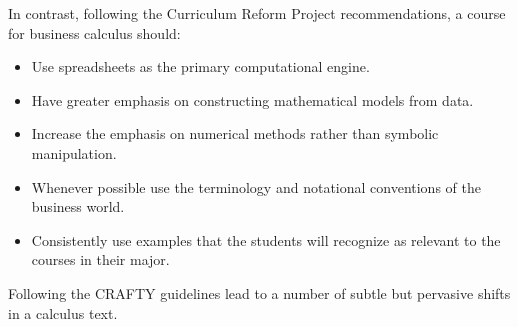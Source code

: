 \documentclass[10pt,]{book}
\theoremstyle{plain}
\theoremstyle{definition}
\theoremstyle{definition}
\begin{document}
In contrast, following the Curriculum Reform Project recommendations, a course for business calculus should:%
\leavevmode%
\begin{itemize}[label=\textbullet]
\item{}Use spreadsheets as the primary computational engine.%
\item{}Have greater emphasis on constructing mathematical models from data.%
\item{}Increase the emphasis on numerical methods rather than symbolic manipulation.%
\item{}Whenever possible use the terminology and notational conventions of the
business world.%
\item{}Consistently use examples that the students will recognize as relevant 
to the courses in their major.%
\end{itemize}
\par
 Following the CRAFTY guidelines lead to a number of subtle but pervasive shifts in a calculus text.%
\leavevmode%
\end{document}
